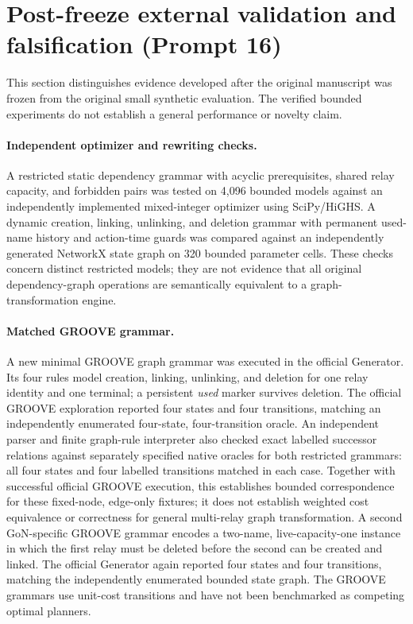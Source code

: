 \documentclass[11pt,a4paper]{article}
\begin{document}
\section{Post-freeze external validation and falsification (Prompt 16)}
\label{sec:postfreeze}
This section distinguishes evidence developed after the original manuscript was frozen from the original small synthetic evaluation. The verified bounded experiments do not establish a general performance or novelty claim.

\paragraph{Independent optimizer and rewriting checks.}
A restricted static dependency grammar with acyclic prerequisites, shared relay capacity, and forbidden pairs was tested on 4,096 bounded models against an independently implemented mixed-integer optimizer using SciPy/HiGHS. A dynamic creation, linking, unlinking, and deletion grammar with permanent used-name history and action-time guards was compared against an independently generated NetworkX state graph on 320 bounded parameter cells. These checks concern distinct restricted models; they are not evidence that all original dependency-graph operations are semantically equivalent to a graph-transformation engine.

\paragraph{Matched GROOVE grammar.}
A new minimal GROOVE graph grammar was executed in the official Generator. Its four rules model creation, linking, unlinking, and deletion for one relay identity and one terminal; a persistent \emph{used} marker survives deletion. The official GROOVE exploration reported four states and four transitions, matching an independently enumerated four-state, four-transition oracle. An independent parser and finite graph-rule interpreter also checked exact labelled successor relations against separately specified native oracles for both restricted grammars: all four states and four labelled transitions matched in each case. Together with successful official GROOVE execution, this establishes bounded correspondence for these fixed-node, edge-only fixtures; it does not establish weighted cost equivalence or correctness for general multi-relay graph transformation. A second GoN-specific GROOVE grammar encodes a two-name, live-capacity-one instance in which the first relay must be deleted before the second can be created and linked. The official Generator again reported four states and four transitions, matching the independently enumerated bounded state graph. The GROOVE grammars use unit-cost transitions and have not been benchmarked as competing optimal planners.
\end{document}
